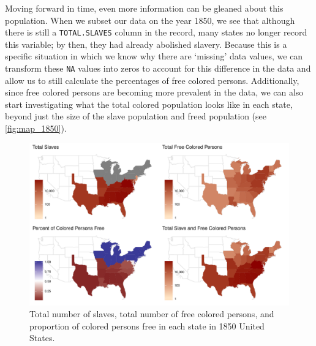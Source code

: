 \documentclass[DIV=calc, paper=a4, fontsize=10pt, twocolumn]{scrartcl}\usepackage[]{graphicx}\usepackage[]{color}
\newenvironment{knitrout}{}{} %
\begin{document}
\par Moving forward in time, even more information can be gleaned about this population. When we subset our data on the year 1850, we see that although there is still a \texttt{TOTAL.SLAVES} column in the record, many states no longer record this variable; by then, they had already abolished slavery. Because this is a specific situation in which we know why there are `missing' data values, we can transform these \texttt{NA} values into zeros to account for this difference in the data and allow us to still calculate the percentages of free colored persons. Additionally, since free colored persons are becoming more prevalent in the data, we can also start investigating what the total colored population looks like in each state, beyond just the size of the slave population and freed population (see \autoref{fig:map_1850}).


\begin{knitrout}
\color{fgcolor}\begin{figure}[h]
\includegraphics[width=.5\textwidth]{figure/map_1850-1} \caption[Total number of slaves, total number of free colored persons, and proportion of colored persons free in each state in 1850 United States]{Total number of slaves, total number of free colored persons, and proportion of colored persons free in each state in 1850 United States.}\label{fig:map_1850}
\end{figure}


\end{knitrout}
\end{document}
